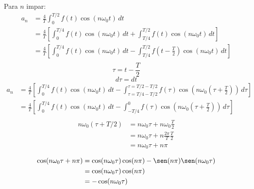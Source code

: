 Para $n$ impar:
\begin{equation*}
\begin{split}
    a_n
        &=\frac{4}{T}\int_0^{T/2} f(t)\cos(n\omega_0 t)\,dt\\
        &=\frac{4}{T}\left[
            \int_0^{T/4} f(t)\cos(n\omega_0 t)\,dt+
            \int_{T/4}^{T/2} f(t)\cos(n\omega_0 t)\,dt
        \right]\\
        &=\frac{4}{T}\left[
            \int_0^{T/4} f(t)\cos(n\omega_0 t)\,dt-
            \int_{T/4}^{T/2} f(t-\frac{T}{2})\cos(n\omega_0 t)\,dt
        \right]\\
\end{split}
\end{equation*}
\begin{equation*}
    \tau=t-\frac{T}{2}
\end{equation*}
\begin{equation*}
    d\tau=dt
\end{equation*}
\begin{equation*}
\begin{split}
    a_n
        &=\frac{4}{T}\left[
            \int_0^{T/4} f(t)\cos(n\omega_0 t)\,dt-
            \int_{\tau=T/4-T/2}^{\tau=T/2-T/2}
                f(\tau)\cos(n\omega_0(\tau+\frac{T}{2}))\,d\tau
        \right]\\
        &=\frac{4}{T}\left[
            \int_0^{T/4} f(t)\cos(n\omega_0 t)\,dt-
            \int_{-T/4}^{0} f(\tau)\cos(n\omega_0(\tau+\frac{T}{2}))\,d\tau
        \right]\\
\end{split}
\end{equation*}
\begin{equation*}
\begin{split}
    n\omega_0(\tau+T/2)
        &=n\omega_0\tau+n\omega_0\frac{T}{2}\\
        &=n\omega_0\tau+n\frac{2\pi}{T}\frac{T}{2}\\
        &=n\omega_0\tau+n\pi\\
\end{split}
\end{equation*}
\begin{equation*}
\begin{split}
    \cos(n\omega_0\tau+n\pi)
        &=\cos(n\omega_0\tau)\cos(n\pi)-\sen(n\pi)\sen(n\omega_0\tau)\\
        &=\cos(n\omega_0\tau)\cos(n\pi)\\
        &=-\cos(n\omega_0\tau)\\
\end{split}
\end{equation*}
